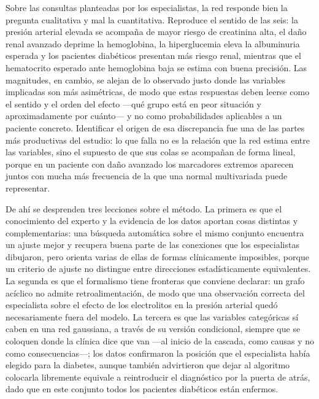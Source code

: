 \documentclass[11pt, a4paper]{article}
\begin{document}
Sobre las consultas planteadas por los especialistas, la red responde bien la pregunta cualitativa
y mal la cuantitativa. Reproduce el sentido de las seis: la presión arterial elevada se acompaña de
mayor riesgo de creatinina alta, el daño renal avanzado deprime la hemoglobina, la hiperglucemia
eleva la albuminuria esperada y los pacientes diabéticos presentan más riesgo renal, mientras que
el hematocrito esperado ante hemoglobina baja se estima con buena precisión. Las magnitudes, en
cambio, se alejan de lo observado justo donde las variables implicadas son más asimétricas, de modo
que estas respuestas deben leerse como el sentido y el orden del efecto —qué grupo está en peor
situación y aproximadamente por cuánto— y no como probabilidades aplicables a un paciente concreto.
Identificar el origen de esa discrepancia fue una de las partes más productivas del estudio: lo que
falla no es la relación que la red estima entre las variables, sino el supuesto de que sus colas se
acompañan de forma lineal, porque en un paciente con daño avanzado los marcadores extremos aparecen
juntos con mucha más frecuencia de la que una normal multivariada puede representar.

De ahí se desprenden tres lecciones sobre el método. La primera es que el conocimiento del experto
y la evidencia de los datos aportan cosas distintas y complementarias: una búsqueda automática sobre
el mismo conjunto encuentra un ajuste mejor y recupera buena parte de las conexiones que los
especialistas dibujaron, pero orienta varias de ellas de formas clínicamente imposibles, porque un
criterio de ajuste no distingue entre direcciones estadísticamente equivalentes. La segunda es que
el formalismo tiene fronteras que conviene declarar: un grafo acíclico no admite retroalimentación,
de modo que una observación correcta del especialista sobre el efecto de los electrolitos en la
presión arterial quedó necesariamente fuera del modelo. La tercera es que las variables categóricas
sí caben en una red gaussiana, a través de su versión condicional, siempre que se coloquen donde la
clínica dice que van —al inicio de la cascada, como causas y no como consecuencias—; los datos
confirmaron la posición que el especialista había elegido para la diabetes, aunque también
advirtieron que dejar al algoritmo colocarla libremente equivale a reintroducir el diagnóstico por
la puerta de atrás, dado que en este conjunto todos los pacientes diabéticos están enfermos.
\end{document}

